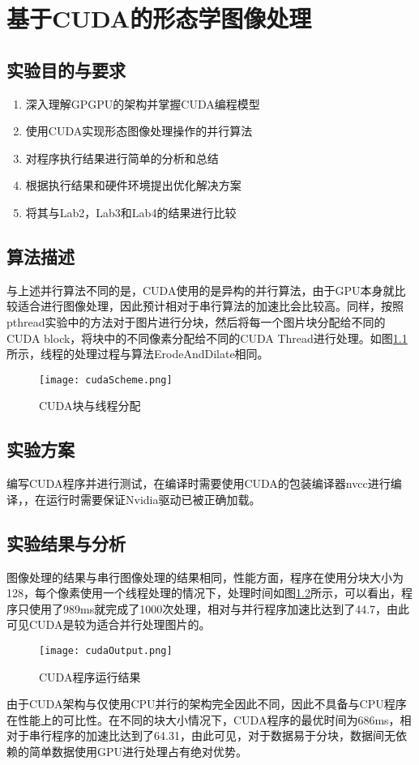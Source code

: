\chapter{基于CUDA的形态学图像处理}
\section{实验目的与要求}
\begin{enumerate}
    \item 深入理解GPGPU的架构并掌握CUDA编程模型
    \item 使用CUDA实现形态图像处理操作的并行算法
    \item 对程序执行结果进行简单的分析和总结
    \item 根据执行结果和硬件环境提出优化解决方案
    \item 将其与Lab2，Lab3和Lab4的结果进行比较
\end{enumerate}

\section{算法描述}
\par 与上述并行算法不同的是，CUDA使用的是异构的并行算法，由于GPU本身就比较适合进行图像处理，因此预计相对于串行算法的加速比会比较高。同样，按照pthread实验中的方法对于图片进行分块，然后将每一个图片块分配给不同的CUDA block，将块中的不同像素分配给不同的CUDA Thread进行处理。如图\ref{fig:cudaScheme}所示，线程的处理过程与算法ErodeAndDilate相同。
\begin{figure}[htpb]
    \centering
    \texttt{[image: cudaScheme.png]}
    \caption{CUDA块与线程分配}
    \label{fig:cudaScheme}
\end{figure}

\section{实验方案}
\par 编写CUDA程序并进行测试，在编译时需要使用CUDA的包装编译器nvcc进行编译，，在运行时需要保证Nvidia驱动已被正确加载。

\section{实验结果与分析}
\par 图像处理的结果与串行图像处理的结果相同，性能方面，程序在使用分块大小为128，每个像素使用一个线程处理的情况下，处理时间如图\ref{fig:cudaOutput}所示，可以看出，程序只使用了989ms就完成了1000次处理，相对与并行程序加速比达到了44.7，由此可见CUDA是较为适合并行处理图片的。

\begin{figure}[htpb]
    \centering
    \texttt{[image: cudaOutput.png]}
    \caption{CUDA程序运行结果}
    \label{fig:cudaOutput}
\end{figure}
\par 由于CUDA架构与仅使用CPU并行的架构完全因此不同，因此不具备与CPU程序在性能上的可比性。在不同的块大小情况下，CUDA程序的最优时间为686ms，相对于串行程序的加速比达到了64.31，由此可见，对于数据易于分块，数据间无依赖的简单数据使用GPU进行处理占有绝对优势。

